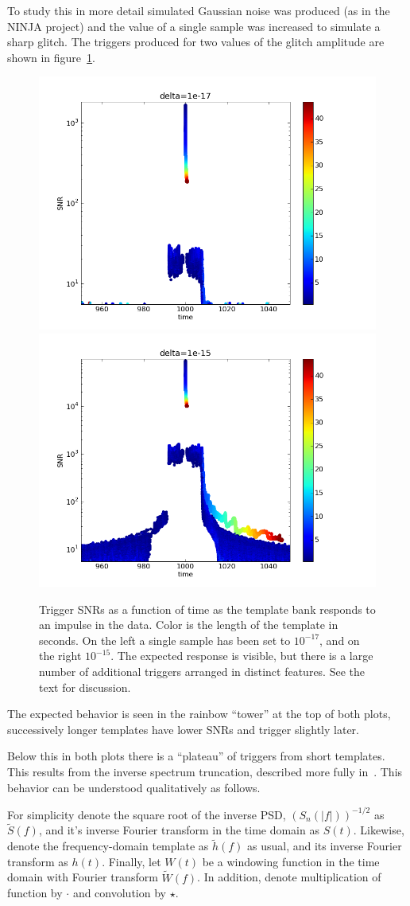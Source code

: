 To study this in more detail simulated Gaussian noise was produced (as
in the NINJA project) and the value of a single sample was increased to
simulate a sharp glitch.  The triggers produced for two values of the
glitch amplitude are shown in
figure~\ref{f:impulses_original_no_chisq}.

\begin{figure}
  \includegraphics[width=0.5\linewidth]{figures/detchar/raw1_1e-17}
  \includegraphics[width=0.5\linewidth]{figures/detchar/raw1_1e-15}
  \caption[Response of the template bank to an impulse] {
  \label{f:impulses_original_no_chisq}
Trigger SNRs as a function of time as the template bank responds to an
impulse in the data.  Color is the length of the template in seconds.
On the left a single sample has been set to $10^{-17}$, and on the
right $10^{-15}$.  The expected response is visible, but there is a
large number of additional triggers arranged in distinct features.
See the text for discussion.
}
\end{figure}%

The expected behavior is seen in the rainbow ``tower'' at the top of
both plots, successively longer templates have lower SNRs and trigger
slightly later.

Below this in both plots there is a ``plateau'' of triggers from short
templates.  This results from the inverse spectrum truncation,
described more fully in~\cite{findchirp}.  This behavior can be
understood qualitatively as follows.

For simplicity denote the square root of the inverse PSD,
$(S_n(|f|))^{-1/2}$ as $\tilde{S}(f)$, and it's inverse Fourier
transform in the time domain as $S(t)$.  Likewise, denote the
frequency-domain template as $\tilde{h}(f)$ as usual, and its inverse
Fourier transform as $h(t)$.  Finally, let $W(t)$ be a windowing
function in the time domain with Fourier transform $\tilde{W}(f)$.  In
addition, denote multiplication of function by $\cdot$ and convolution
by $\star$.

